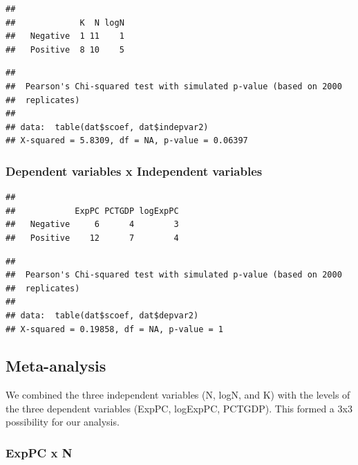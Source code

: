 \documentclass[
]{article}
\begin{document}
\begin{verbatim}
##           
##             K  N logN
##   Negative  1 11    1
##   Positive  8 10    5
\end{verbatim}

\begin{verbatim}
## 
##  Pearson's Chi-squared test with simulated p-value (based on 2000
##  replicates)
## 
## data:  table(dat$scoef, dat$indepvar2)
## X-squared = 5.8309, df = NA, p-value = 0.06397
\end{verbatim}

\newpage

\hypertarget{dependent-variables-x-independent-variables}{%
\subsubsection{Dependent variables x Independent
variables}\label{dependent-variables-x-independent-variables}}

\begin{verbatim}
##           
##            ExpPC PCTGDP logExpPC
##   Negative     6      4        3
##   Positive    12      7        4
\end{verbatim}

\begin{verbatim}
## 
##  Pearson's Chi-squared test with simulated p-value (based on 2000
##  replicates)
## 
## data:  table(dat$scoef, dat$depvar2)
## X-squared = 0.19858, df = NA, p-value = 1
\end{verbatim}

\newpage

\hypertarget{meta-analysis}{%
\subsection{Meta-analysis}\label{meta-analysis}}

We combined the three independent variables (N, logN, and K) with the
levels of the three dependent variables (ExpPC, logExpPC, PCTGDP). This
formed a 3x3 possibility for our analysis.

\hypertarget{exppc-x-n}{%
\subsubsection{ExpPC x N}\label{exppc-x-n}}
\end{document}
